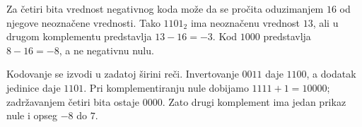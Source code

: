 
Za četiri bita vrednost negativnog koda može da se pročita oduzimanjem $16$ od njegove neoznačene vrednosti. Tako $1101_2$ ima neoznačenu vrednost $13$, ali u drugom komplementu predstavlja $13-16=-3$. Kod $1000$ predstavlja $8-16=-8$, a ne negativnu nulu.

Kodovanje se izvodi u zadatoj širini reči. Invertovanje $0011$ daje $1100$, a dodatak jedinice daje $1101$. Pri komplementiranju nule dobijamo $1111+1=10000$; zadržavanjem četiri bita ostaje $0000$. Zato drugi komplement ima jedan prikaz nule i opseg $-8$ do $7$.
